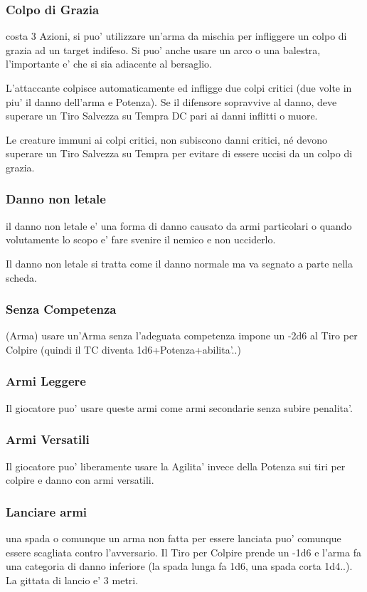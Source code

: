 \documentclass[a4paper,11pt,twoside,openany]{book}
\begin{document}
	\subsubsection{Colpo di Grazia} costa 3 Azioni, si puo' utilizzare un'arma da mischia per infliggere un colpo di grazia ad un target indifeso. Si puo' anche usare un arco o una balestra, l'importante e' che si sia adiacente al bersaglio.
	
	L'attaccante colpisce automaticamente ed infligge due colpi critici (due volte in piu' il danno dell'arma e Potenza). Se il difensore sopravvive al danno, deve superare un Tiro Salvezza su Tempra DC pari ai danni inflitti o muore.
	
	Le creature immuni ai colpi critici, non subiscono danni critici, né devono superare un Tiro Salvezza su Tempra per evitare di essere uccisi da un colpo di grazia.
	
	\subsubsection{Danno non letale} il danno non letale e' una forma di danno causato da armi particolari o quando volutamente lo scopo e' fare svenire il nemico e non ucciderlo.
	
	Il danno non letale si tratta come il danno normale ma va segnato a parte nella scheda.
	
	\subsubsection{Senza Competenza} (Arma) usare un'Arma senza l'adeguata competenza impone un -2d6 al Tiro per Colpire (quindi il TC diventa 1d6+Potenza+abilita'..) 
	
	\subsubsection{Armi Leggere} Il giocatore puo' usare queste armi come armi secondarie senza subire penalita'.
	
	\subsubsection{Armi Versatili} Il giocatore puo' liberamente usare la Agilita' invece della Potenza sui tiri per colpire e danno con armi versatili.
	
	\subsubsection{Lanciare armi} una spada o comunque un arma non fatta per essere lanciata puo' comunque essere scagliata contro l'avversario.
	Il Tiro per Colpire prende un -1d6 e l'arma fa una categoria di danno inferiore (la spada lunga fa 1d6, una spada corta 1d4..). La gittata di lancio e' 3 metri.
	
\end{document}
